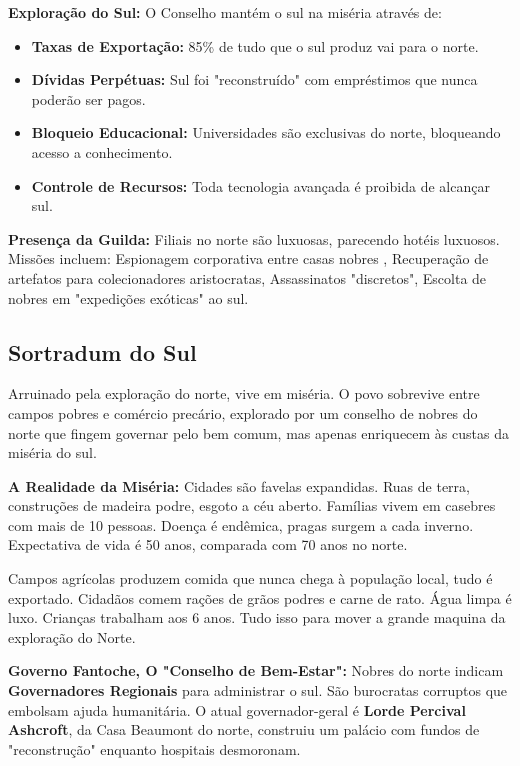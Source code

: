 \textbf{\ringmfamily Exploração do Sul:}
O Conselho mantém o sul na miséria através de:
\begin{itemize}
    \item \textbf{Taxas de Exportação:} 85\% de tudo que o sul produz vai para o norte.
    \item \textbf{Dívidas Perpétuas:} Sul foi "reconstruído" com empréstimos que nunca poderão ser pagos.
    \item \textbf{Bloqueio Educacional:} Universidades são exclusivas do norte, bloqueando acesso a conhecimento.
    \item \textbf{Controle de Recursos:} Toda tecnologia avançada é proibida de alcançar sul.
\end{itemize}

\textbf{\ringmfamily Presença da Guilda:} Filiais no norte são luxuosas, parecendo hotéis luxuosos. Missões incluem: Espionagem corporativa entre casas nobres
, Recuperação de artefatos para colecionadores aristocratas, Assassinatos "discretos", Escolta de nobres em "expedições exóticas" ao sul.

\subsection*{Sortradum do Sul}
Arruinado pela exploração do norte, vive em miséria. O povo sobrevive entre campos pobres e comércio precário, explorado por um conselho de nobres do norte que fingem governar pelo bem comum, mas apenas enriquecem às custas da miséria do sul.

\textbf{\ringmfamily A Realidade da Miséria:}
Cidades são favelas expandidas. Ruas de terra, construções de madeira podre, esgoto a céu aberto. Famílias vivem em casebres com mais de 10 pessoas. Doença é endêmica, pragas surgem a cada inverno. Expectativa de vida é 50 anos, comparada com 70 anos no norte.

Campos agrícolas produzem comida que nunca chega à população local, tudo é exportado. Cidadãos comem rações de grãos podres e carne de rato. Água limpa é luxo. Crianças trabalham aos 6 anos. Tudo isso para mover a grande maquina da exploração do Norte.

\textbf{\ringmfamily Governo Fantoche, O "Conselho de Bem-Estar":}
Nobres do norte indicam \textbf{Governadores Regionais} para administrar o sul. São burocratas corruptos que embolsam ajuda humanitária. O atual governador-geral é \textbf{Lorde Percival Ashcroft}, da Casa Beaumont do norte, construiu um palácio com fundos de "reconstrução" enquanto hospitais desmoronam.


